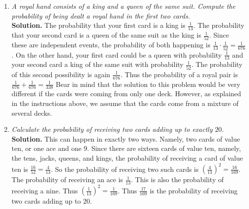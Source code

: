 \documentclass[12pt]{article}
\begin{document}
\begin{enumerate}
\item{\em A {\em royal hand} consists of a king and a queen
of the same suit. Compute the probability of being
dealt a royal hand in the first two cards.}\\
{\bf Solution.} The probability that your first card
is a king is $\frac{1}{13}$.
The probability that your second card is a queen of the same
suit as the king is $\frac{1}{52}$. Since these are independent events,
the probability of both happening is
$\frac{1}{13}\cdot\frac{1}{52}=\frac{1}{676}$.
On the other hand, your first card could be a queen with probability
$\frac{1}{13}$ and your second card a king of the same suit
with probability $\frac{1}{52}$.
The probability of this second possibility is again $\frac{1}{676}$.
Thus the probability of a royal pair is
$\frac{1}{676}+\frac{1}{676}=\frac{1}{338}$
Bear in mind that the solution to this problem would be very
different if the cards were coming from only one deck. However,
as explained in the instructions above, we assume that the cards
come from a mixture of several decks.

\item{\em Calculate the probability of receiving two
cards adding up to exactly $20$.}\\
{\bf Solution.} This can happen in exactly two ways. Namely,
two cards of value ten, or one ace and one $9$.
Since there are sixteen cards of value ten, namely,
the tens, jacks, queens, and kings, the probability of receiving
a card of value ten is $\frac{16}{52}=\frac{4}{13}$.
So the probability of receiving two such cards is
$\left(\frac{4}{13}\right)^2=\frac{16}{169}$.
The probability of receiving an ace is $\frac{1}{13}$.
This is also the probability of receiving a nine.
Thus $\left(\frac{1}{13}\right)^2=\frac{1}{169}$.
Thus $\frac{17}{169}$ is the probability of receiving two
cards adding up to $20$.

\end{enumerate}
\end{document}
